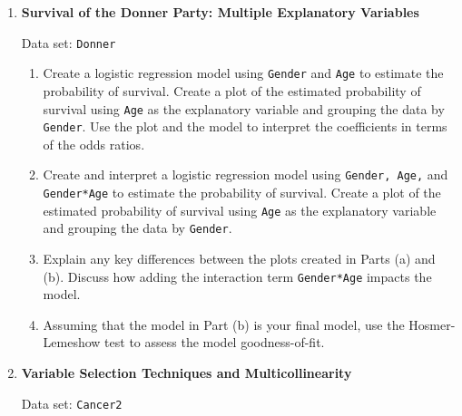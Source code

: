 \documentclass[
]{report}
\begin{document}
\begin{enumerate}
  \item \textbf{Survival of the Donner Party: Multiple Explanatory Variables}

Data set: \texttt{Donner}

  \begin{enumerate}
    \item Create a logistic regression model using \texttt{Gender} and \texttt{Age} to estimate the probability of survival. Create a plot of the estimated probability of survival using \texttt{Age} as the explanatory variable and grouping the data by \texttt{Gender}. Use the plot and the model to interpret the coefficients in terms of the odds ratios.
    \item Create and interpret a logistic regression model using \texttt{Gender, Age,} and \texttt{Gender*Age} to estimate the probability of survival. Create a plot of the estimated probability of survival using \texttt{Age} as the explanatory variable and grouping the data by \texttt{Gender}.
    \item Explain any key differences between the plots created in Parts (a) and (b). Discuss how adding the interaction term \texttt{Gender*Age} impacts the model.
    \item Assuming that the model in Part (b) is your final model, use the Hosmer-Lemeshow test to assess the model goodness-of-fit.
  \end{enumerate}

  \item \textbf{Variable Selection Techniques and Multicollinearity}

Data set: \texttt{Cancer2}


\end{enumerate}
\end{document}
